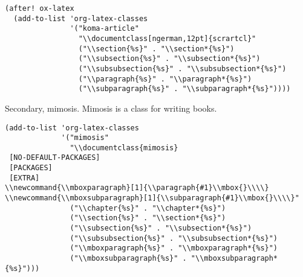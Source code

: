\documentclass[11pt]{article}
\begin{document}
\begin{verbatim}
(after! ox-latex
  (add-to-list 'org-latex-classes
               '("koma-article"
                 "\\documentclass[ngerman,12pt]{scrartcl}"
                 ("\\section{%s}" . "\\section*{%s}")
                 ("\\subsection{%s}" . "\\subsection*{%s}")
                 ("\\subsubsection{%s}" . "\\subsubsection*{%s}")
                 ("\\paragraph{%s}" . "\\paragraph*{%s}")
                 ("\\subparagraph{%s}" . "\\subparagraph*{%s}"))))
\end{verbatim}
Secondary, mimosis.
Mimosis is a class for writing books.
\begin{verbatim}
(add-to-list 'org-latex-classes
             '("mimosis"
               "\\documentclass{mimosis}
 [NO-DEFAULT-PACKAGES]
 [PACKAGES]
 [EXTRA]
\\newcommand{\\mboxparagraph}[1]{\\paragraph{#1}\\mbox{}\\\\}
\\newcommand{\\mboxsubparagraph}[1]{\\subparagraph{#1}\\mbox{}\\\\}"
               ("\\chapter{%s}" . "\\chapter*{%s}")
               ("\\section{%s}" . "\\section*{%s}")
               ("\\subsection{%s}" . "\\subsection*{%s}")
               ("\\subsubsection{%s}" . "\\subsubsection*{%s}")
               ("\\mboxparagraph{%s}" . "\\mboxparagraph*{%s}")
               ("\\mboxsubparagraph{%s}" . "\\mboxsubparagraph*{%s}")))
\end{verbatim}
\end{document}
